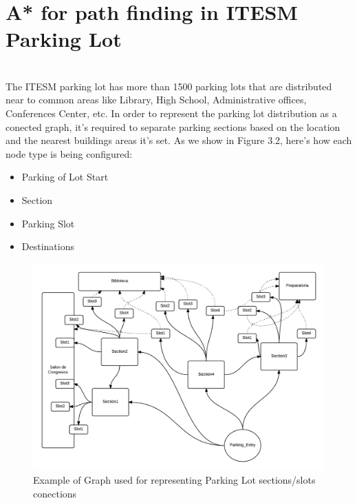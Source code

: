 \section{A* for path finding in ITESM Parking Lot}
\paragraph{} ~\\
The ITESM parking lot has more than 1500 parking lots that are distributed near to common areas like Library, High School, Administrative offices, Conferences Center, etc.
In order to represent the parking lot distribution as a conected graph, it's required to separate parking sections based on the location and the nearest buildings areas 
it's set.
As we show in Figure 3.2, here's how each node type is being configured:
\begin{itemize}
\item{Parking of Lot Start}
\item{Section}
\item{Parking Slot}
\item{Destinations}
\end{itemize}

\begin{figure}[H]
    \centering
    \includegraphics[width=1\textwidth]{images/parking_lot_diagram.png}
    \caption{Example of Graph used for representing Parking Lot sections/slots conections}
    \label{fig:parking_lot_diagram}
\end{figure}

